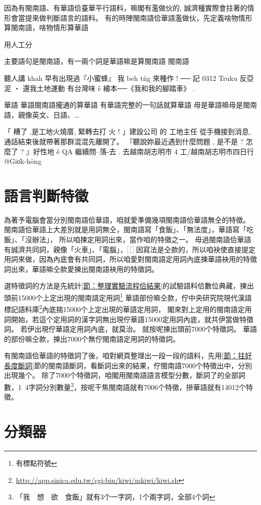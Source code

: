 \documentclass[final,oneside,onecolumn,12pt,a4paper]{book}%
\begin{document}
因為有閩南語、有華語佮臺華平行語料，嘛閣有濫做伙的, 誠濟種實際會拄著的情形會當提來做判斷語言的語料。
有的時陣閩南語佮華語濫做伙，先定義啥物情形算閩南語，啥物情形算華語

用人工分

主要語句是閩南語，有一兩个詞是華語嘛是算閩南語
閩南語

聽人講 khah 早有出現過『小蜜蜂』
我 beh tńg 來種作 ! ── 記 0312 Truku 反亞泥 ‧ 還我土地運動
有台灣味 ê 繪本──《我和我的腳踏車》 .

華語
華語閩南語攏通的算華語
有華語完整的一句話就算華語
毋是華語嘛毋是閩南語，親像英文、日語、…

「 糟了 ,是工地火燒厝, 緊轉去打 火 ! 」建設公司 的 工地主任 從手機接到消息,通話結束後就帶著那群混混先離開了。
『聽說妳最近遇到什麼問題 , 是不是 ? 怎麼了 ? 』好性地 ê QA 繼續問--落-去 .
去越南胡志明市 4 工/越南胡志明市四日行 @Gio̍k-hōng


\section{語言判斷特徵}
\label{節：語言判斷特徵}
為著予電腦會當分別閩南語佮華語，咱就愛準備幾項閩南語佮華語無仝的特徵。
閩南語佮華語上大差別就是用詞無仝，閩南語寫「食飯」、「無法度」，華語寫「吃飯」、「沒辦法」，
所以咱揀定用詞出來，當作咱的特徵之一。
毋過閩南語佮華語有誠濟共同詞，親像「火車」、「電腦」，⿰因寫法是仝款的，所以咱袂使直接提定用詞來做，因為內底會有共同詞，所以咱愛對閩南語定用詞內底揀華語袂用的特徵詞出來，華語嘛仝款愛揀出閩南語袂用的特徵詞。

選特徵詞的方法是先統計\ref{節：整理實驗流程佮結果}的試驗語料佮數位典藏，揀出頭前15000个上定出現的閩南語定用詞\footnote{有標點符號}
華語部份嘛仝款，佇中央研究院現代漢語標記語料庫\footnote{\url{http://app.sinica.edu.tw/cgi-bin/kiwi/mkiwi/kiwi.sh}}內底揣15000个上定出現的華語定用詞，
閣來對上定用的閩南語定用詞開始，若這个定用詞的漢字詞無出現佇華語15000定用詞內底，就共伊當做特徵詞。
若伊出現佇華語定用詞內底，就莫治。
就按呢揀出頭前7000个特徵詞。
華語的部份嘛仝款，揀出7000个無佇閩南語定用詞的特徵詞。


有閩南語佮華語的特徵詞了後，咱對網頁整理出一段一段的語料，先用\ref{節：拄好長度斷詞}節的閩南語斷詞，看斷詞出來的結果，佇閩南語7000个特徵出中，分別出現幾个。
除了7000个特徵詞，咱閣用閩南語語言模型分數，斷詞了的全部詞數，1~4字詞分別數量\footnote{「我　想　欲　食飯」就有3个一字詞，1个兩字詞，全部4个詞}，按呢干焦閩南語就有7006个特徵，摻華語就有14012个特徵。

\section{分類器}
\label{節：分類器}
\end{document}
